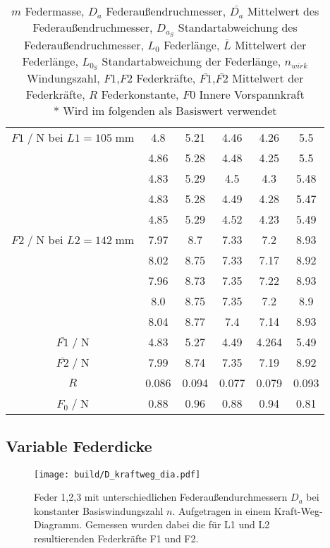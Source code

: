 \begin{table}[H]
\begin{tabular}{c | c c c c c}
        $F1\;/\;$N bei $L1=105\;$mm & 4.8 & 5.21 & 4.46 & 4.26 & 5.5\\
                         & 4.86 & 5.28 & 4.48 & 4.25 & 5.5\\
                         & 4.83 & 5.29 & 4.5 & 4.3 & 5.48\\
                         & 4.83 & 5.28 & 4.49 & 4.28 & 5.47\\
                         & 4.85 & 5.29 & 4.52 & 4.23 & 5.49\\
        \midrule
        $F2\;/\;$N bei $L2=142\;$mm & 7.97 & 8.7 & 7.33 & 7.2 & 8.93\\
                         & 8.02 & 8.75 & 7.33 & 7.17 & 8.92\\
                         & 7.96 & 8.73 & 7.35 & 7.22 & 8.93\\
                         & 8.0 & 8.75 & 7.35 & 7.2 & 8.9\\
                         & 8.04 & 8.77 & 7.4 & 7.14 & 8.93\\
        \midrule
        $\bar{F1}\;/\;$N & 4.83 & 5.27 & 4.49 & 4.264 & 5.49\\
        $\bar{F2}\;/\;$N & 7.99 & 8.74 & 7.35 & 7.19 & 8.92\\
        \midrule
        $R$ & 0.086 & 0.094 & 0.077 & 0.079 & 0.093\\
        \midrule
        $F_0\;/\;$N & 0.88 & 0.96 & 0.88 & 0.94 & 0.81\\ 
        \bottomrule
    \end{tabular}
    \caption{$m$ Federmasse,
             $D_a$ Federaußendruchmesser, 
             $\bar{D_a}$ Mittelwert des Federaußendruchmesser, 
             $D_{a_S}$ Standartabweichung des Federaußendruchmesser,
             $L_0$ Federlänge,
             $\bar{L}$ Mittelwert der Federlänge,
             $L_{0_S}$ Standartabweichung der Federlänge,
             $n_{wirk}$ Windungszahl,
             $F1$,$F2$ Federkräfte,
             $\bar{F1}$,$\bar{F2}$ Mittelwert der Federkräfte,
             $R$ Federkonstante,
             $F0$ Innere Vorspannkraft\\
             * Wird im folgenden als Basiswert verwendet
    }
    \label{tab:Wertetabelle}
\end{table}


\subsection{Variable Federdicke}
\begin{figure}[H]
    \center
    \texttt{[image: build/D\_kraftweg\_dia.pdf]}
    \caption{Feder 1,2,3 mit unterschiedlichen Federaußendurchmessern $D_a$ bei konstanter Basiswindungszahl $n$.
    Aufgetragen in einem Kraft-Weg-Diagramm. Gemessen wurden dabei
    die für L1 und L2 resultierenden Federkräfte F1 und F2.}
    \label{tab:LF_D}
\end{figure}
